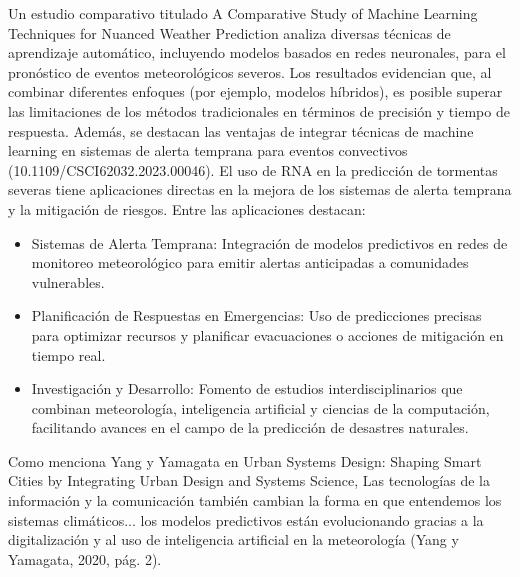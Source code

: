 \documentclass{article}
\begin{document}
Un estudio comparativo titulado A Comparative Study of Machine Learning Techniques for Nuanced Weather Prediction analiza diversas técnicas de aprendizaje automático, incluyendo modelos basados en redes neuronales, para el pronóstico de eventos meteorológicos severos. Los resultados evidencian que, al combinar diferentes enfoques (por ejemplo, modelos híbridos), es posible superar las limitaciones de los métodos tradicionales en términos de precisión y tiempo de respuesta. Además, se destacan las ventajas de integrar técnicas de machine learning en sistemas de alerta temprana para eventos convectivos (10.1109/CSCI62032.2023.00046). 
El uso de RNA en la predicción de tormentas severas tiene aplicaciones directas en la mejora de los sistemas de alerta temprana y la mitigación de riesgos. Entre las aplicaciones destacan: 
\begin{itemize}
    \item Sistemas de Alerta Temprana: Integración de modelos predictivos en redes de monitoreo meteorológico para emitir alertas anticipadas a comunidades vulnerables.
    \item Planificación de Respuestas en Emergencias: Uso de predicciones precisas para optimizar recursos y planificar evacuaciones o acciones de mitigación en tiempo real.
    \item Investigación y Desarrollo: Fomento de estudios interdisciplinarios que combinan meteorología, inteligencia artificial y ciencias de la computación, facilitando avances en el campo de la predicción de desastres naturales.
\end{itemize}
Como menciona Yang y Yamagata en Urban Systems Design: Shaping Smart Cities by Integrating Urban Design and Systems Science, Las tecnologías de la información y la comunicación también cambian la forma en que entendemos los sistemas climáticos... los modelos predictivos están evolucionando gracias a la digitalización y al uso de inteligencia artificial en la meteorología (Yang y Yamagata, 2020, pág. 2). 
\end{document}

